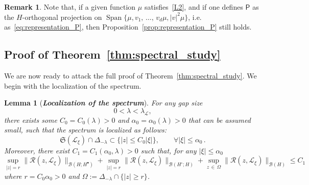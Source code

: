 \documentclass[10pt]{amsart}
\newtheorem{lemm}[theo]{Lemma}\newtheorem{prop}[theo]{Proposition}\newtheorem{coro}[theo]{Corollary}\newtheorem{conj}[theo]{Conjecture}
\theoremstyle{definition}\newtheorem{defi}[theo]{Definition}\newtheorem{rema}[theo]{Remark}\newtheorem{exam}[theo]{Example}\newtheorem{exem}[theo]{Example}\newtheorem{nota}[theo]{Notation}
\DeclareMathOperator{\Span}{Span}
\newcommand{\fkS}{\mathfrak{S}}
\newcommand{\LL}{\mathcal{L}}
\newcommand{\PP}{\mathsf{P}}
\newcommand{\RR}{\mathcal{R}}
\newcommand{\BBB}{\mathscr{B}}
\newcommand{\Ss}{H}
\newcommand{\Ssp}{H^{\bullet}}
\newcommand{\Ssm}{H^{\circ}}
\renewcommand*\le{\leqslant}
\renewcommand*\ge{\geqslant}
\renewcommand*\leq{\leqslant}
\let\oldforall\forall
\renewcommand*{\forall}{\mathrel{\oldforall}}
\begin{document}
\begin{rema}
Note that, if a given function $\mu$ satisfies~\eqref{L2}, and if one defines $\PP$ as the $\Ss$-orthogonal projection on $\Span \{\mu, v_1,\,\dots,\,v_d \mu, |v|^2 \mu\}$, i.e. as~\eqref{eq:representation_P}, then Proposition~\ref{prop:representation_P} still holds.
\end{rema}

\subsection{Proof of Theorem~\ref{thm:spectral_study}}

We are now ready to attack the full proof of Theorem~\ref{thm:spectral_study}. We begin with the localization of the spectrum.


\begin{lemm}[\emph{\textbf{Localization of the spectrum}}]\label{lem:localization_spectrum}
For any gap size
\[
0 < \lambda < \lambda_\LL,
\]
there exists some $C_0=C_0(\lambda) > 0$ and $\alpha_{0} = \alpha_{0}(\lambda) > 0$ that can be assumed small, such that the spectrum is localized as follows:
\[
\fkS(\LL_{\xi}) \cap \Delta_{-\lambda} \subset \big\{ | z | \le C_0 | \xi | \big\}, \qquad \forall | \xi | \le \alpha_{0}\,.
\]
Moreover, there exist $C_1=C_1(\alpha_{0}, \lambda) > 0$ such that, for any $|\xi| \leq \alpha_{0}$
\begin{equation}\label{eq:bound_L_xi}
\sup_{ | z | = r } \| \RR(z,\LL_{\xi}) \|_{\BBB(\Ss;\Ssp) } + \sup_{|z| = r} \| \RR(z, \LL_\xi) \|_{ \BBB(\Ssm ; \Ss) } + \sup_{z\,\in\,\Omega} \| \RR(z,\LL_{\xi}) \|_{\BBB(\Ss)} \le C_1
\end{equation}
where $r=C_{0}\alpha_{0} >0$ and $\Omega := \Delta_{-\lambda} \cap \{ | z | \ge r \}$.
\end{lemm}
\end{document}
